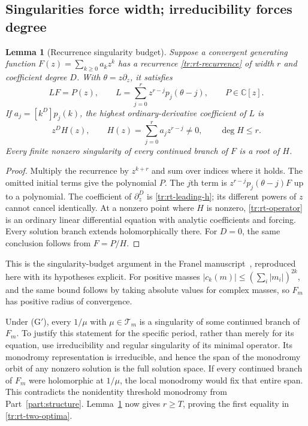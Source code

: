 \documentclass[11pt,a4paper]{article}
\newtheorem{lemma}[theorem]{Lemma}
\theoremstyle{definition}
\theoremstyle{remark}
\numberwithin{equation}{section}
\begin{document}
\subsection{Singularities force width; irreducibility forces degree}

\begin{lemma}[Recurrence singularity budget]
\label{tr:rt-budget}
Suppose a convergent generating function $F(z)=\sum_{k\ge0}a_kz^k$
has a recurrence \eqref{tr:rt-recurrence} of width $r$ and coefficient
degree $D$.  With $\theta=z\partial_z$, it satisfies
\begin{equation}
\label{tr:rt-operator}
 LF=P(z),\qquad
 L=\sum_{j=0}^r z^{r-j}p_j(\theta-j),\qquad P\in\mathbb C[z].
\end{equation}
If $a_j=[k^D]p_j(k)$, the highest ordinary-derivative coefficient
of $L$ is
\begin{equation}
\label{tr:rt-leading-h}
 z^DH(z),\qquad H(z)=\sum_{j=0}^r a_jz^{r-j}\ne0,
 \qquad \deg H\le r.
\end{equation}
Every finite nonzero singularity of every continued branch of $F$
is a root of $H$.
\end{lemma}
\begin{proof}
Multiply the recurrence by $z^{k+r}$ and sum over indices where it
holds.  The omitted initial terms give the polynomial $P$.
The $j$th term is $z^{r-j}p_j(\theta-j)F$ up to a polynomial.
The coefficient of $\partial_z^D$ is \eqref{tr:rt-leading-h}; its
different powers of $z$ cannot cancel identically.  At a nonzero
point where $H$ is nonzero, \eqref{tr:rt-operator} is an ordinary
linear differential equation with analytic coefficients and forcing.
Every solution branch extends holomorphically there.  For $D=0$,
the same conclusion follows from $F=P/H$.
\end{proof}

This is the singularity-budget argument in the Franel
manuscript~\cite{KeioFranel}, reproduced here with its hypotheses explicit.
For positive masses $|c_k(m)|\le(\sum_i|m_i|)^{2k}$, and the same
bound follows by taking absolute values for complex masses, so
$F_m$ has positive radius of convergence.

Under \textup{(G$'$)}, every $1/\mu$ with $\mu\in\mathcal T_m$ is a
singularity of some continued branch of $F_m$.  To justify this
statement for the specific period, rather than merely for its
equation, use irreducibility and regular singularity of its minimal
operator.  Its monodromy representation is irreducible, and hence
the span of the monodromy orbit of any nonzero solution is the full
solution space.  If every continued branch of $F_m$ were
holomorphic at $1/\mu$, the local monodromy would fix that entire
span.  This contradicts the nonidentity threshold monodromy from
Part~\ref{part:structure}.  Lemma~\ref{tr:rt-budget} now gives $r\ge T$, proving the
first equality in \eqref{tr:rt-two-optima}.
\end{document}
